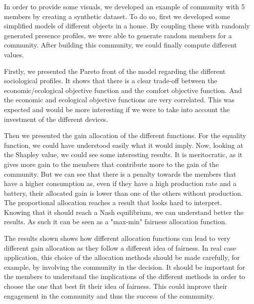 In order to provide some visuals, we developed an example of community with 5 members by creating a synthetic dataset. To do so, first we developed some simplified models of different objects in a house. By coupling these with randomly generated presence profiles, we were able to generate random members for a community. After building this community, we could finally compute different values.

Firstly, we presented the Pareto front of the model regarding the different sociological profiles. It shows that there is a clear trade-off between the economic/ecological objective function and the comfort objective function. And the economic and ecological objective functions are very correlated. This was expected and would be more interesting if we were to take into account the investment of the different devices.

Then we presented the gain allocation of the different functions. For the equality function, we could have understood easily what it would imply. Now, looking at the Shapley value, we could see some interesting results. It is meritocratic, as it gives more gain to the members that contribute more to the gain of the community. But we can see that there is a penalty towards the members that have a higher consumption as, even if they have a high production rate and a battery, their allocated gain is lower than one of the others without production. The proportional allocation reaches a result that looks hard to interpret. Knowing that it should reach a Nash equilibrium, we can understand better the results. As such it can be seen as a "max-min" fairness allocation function.

The results shown shows how different allocation functions can lead to very different gain allocation as they follow a different idea of fairness. In real case application, this choice of the allocation methods should be made carefully, for example, by involving the community in the decision. It should be important for the members to understand the implications of the different methods in order to choose the one that best fit their idea of fairness. This could improve their engagement in the community and thus the success of the community.

